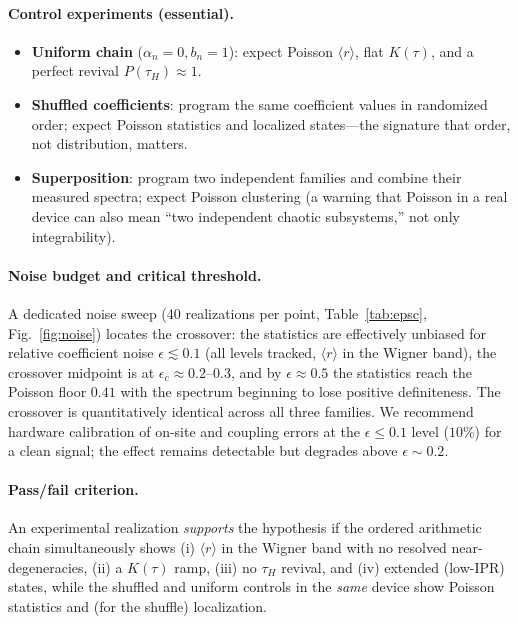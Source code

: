 \documentclass[aps,prx,reprint,floatfix]{revtex4-2}
\begin{document}
\paragraph{Control experiments (essential).}
\begin{itemize}[leftmargin=1.4em]
\item \textbf{Uniform chain} ($\alpha_n=0,b_n=1$): expect Poisson
$\langle r\rangle$, flat $K(\tau)$, and a perfect revival $P(\tau_H)\approx1$.
\item \textbf{Shuffled coefficients}: program the same coefficient values
in randomized order; expect Poisson statistics and localized states---the
signature that order, not distribution, matters.
\item \textbf{Superposition}: program two independent families and combine
their measured spectra; expect Poisson clustering (a warning that Poisson
in a real device can also mean ``two independent chaotic subsystems,'' not
only integrability).
\end{itemize}

\paragraph{Noise budget and critical threshold.}
A dedicated noise sweep (40 realizations per point, Table~\ref{tab:epsc},
Fig.~\ref{fig:noise}) locates the crossover: the statistics are effectively
unbiased for relative coefficient noise $\epsilon\lesssim0.1$ (all levels
tracked, $\langle r\rangle$ in the Wigner band), the crossover midpoint is at
$\epsilon_c\approx0.2$--$0.3$, and by $\epsilon\approx0.5$ the statistics
reach the Poisson floor $0.41$ with the spectrum beginning to lose positive
definiteness. The crossover is quantitatively identical across all three
families. We recommend hardware calibration of on-site and coupling errors at
the $\epsilon\le0.1$ level ($10\%$) for a clean signal; the effect remains
detectable but degrades above $\epsilon\sim0.2$.

\paragraph{Pass/fail criterion.}
An experimental realization \emph{supports} the hypothesis if the
ordered arithmetic chain simultaneously shows (i) $\langle r\rangle$ in the
Wigner band with no resolved near-degeneracies, (ii) a $K(\tau)$ ramp,
(iii) no $\tau_H$ revival, and (iv) extended (low-IPR) states, while the
shuffled and uniform controls in the \emph{same} device show Poisson
statistics and (for the shuffle) localization.
\end{document}
